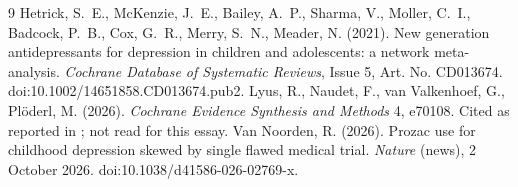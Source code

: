 \documentclass[11pt]{article}
\theoremstyle{definition}
\begin{document}
\begin{thebibliography}{9}
 Hetrick, S.~E., McKenzie, J.~E., Bailey, A.~P., Sharma, V., Moller, C.~I., Badcock, P.~B., Cox, G.~R., Merry, S.~N., Meader, N. (2021). New generation antidepressants for depression in children and adolescents: a network meta-analysis. \emph{Cochrane Database of Systematic Reviews}, Issue 5, Art. No. CD013674. doi:10.1002/14651858.CD013674.pub2.
 Lyus, R., Naudet, F., van Valkenhoef, G., Pl\"oderl, M. (2026). \emph{Cochrane Evidence Synthesis and Methods} 4, e70108. Cited as reported in \citet{vannoorden2026}; not read for this essay.
 Van Noorden, R. (2026). Prozac use for childhood depression skewed by single flawed medical trial. \emph{Nature} (news), 2 October 2026. doi:10.1038/d41586-026-02769-x.
\end{thebibliography}
\end{document}
